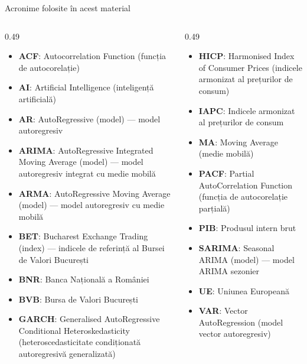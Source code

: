 \begin{frame}{Acronime folosite în acest material}
\begin{columns}[T]
\begin{column}{0.49\textwidth}
\begin{itemize}\setlength{\itemsep}{0pt}
    \item \textbf{ACF}: Autocorrelation Function (funcția de autocorelație)
    \item \textbf{AI}: Artificial Intelligence (inteligență artificială)
    \item \textbf{AR}: AutoRegressive (model) — model autoregresiv
    \item \textbf{ARIMA}: AutoRegressive Integrated Moving Average (model) — model autoregresiv integrat cu medie mobilă
    \item \textbf{ARMA}: AutoRegressive Moving Average (model) — model autoregresiv cu medie mobilă
    \item \textbf{BET}: Bucharest Exchange Trading (index) — indicele de referință al Bursei de Valori București
    \item \textbf{BNR}: Banca Națională a României
    \item \textbf{BVB}: Bursa de Valori București
    \item \textbf{GARCH}: Generalised AutoRegressive Conditional Heteroskedasticity (heteroscedasticitate condiționată autoregresivă generalizată)
\end{itemize}
\end{column}
\begin{column}{0.49\textwidth}
\begin{itemize}\setlength{\itemsep}{0pt}
    \item \textbf{HICP}: Harmonised Index of Consumer Prices (indicele armonizat al prețurilor de consum)
    \item \textbf{IAPC}: Indicele armonizat al prețurilor de consum
    \item \textbf{MA}: Moving Average (medie mobilă)
    \item \textbf{PACF}: Partial AutoCorrelation Function (funcția de autocorelație parțială)
    \item \textbf{PIB}: Produsul intern brut
    \item \textbf{SARIMA}: Seasonal ARIMA (model) — model ARIMA sezonier
    \item \textbf{UE}: Uniunea Europeană
    \item \textbf{VAR}: Vector AutoRegression (model vector autoregresiv)
\end{itemize}
\end{column}
\end{columns}
\end{frame}

